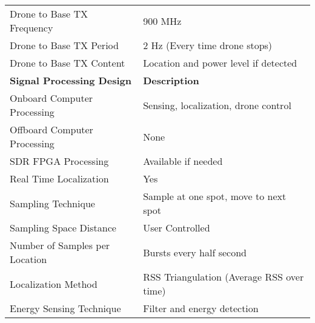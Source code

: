 \begin{table}[h]
\begin{tabular}{|l|l|}
            Drone to Base TX Frequency            & 900 MHz                                   \\
            Drone to Base TX Period               & 2 Hz (Every time drone stops)             \\
            Drone to Base TX Content              & Location and power level if detected      \\
    \hline  \textbf{Signal Processing Design}     & \textbf{Description}                      \\ \hline
            Onboard Computer Processing           & Sensing, localization, drone control      \\
            Offboard Computer Processing          & None                                      \\
            SDR FPGA Processing                   & Available if needed                       \\
            Real Time Localization                & Yes                                       \\
            Sampling Technique                    & Sample at one spot, move to next spot     \\
            Sampling Space Distance               & User Controlled                           \\
            Number of Samples per Location        & Bursts every half second                  \\
            Localization Method                   & RSS Triangulation (Average RSS over time) \\
            Energy Sensing Technique              & Filter and energy detection               \\ \hline
\end{tabular}
\end{table}\par
\pagebreak
